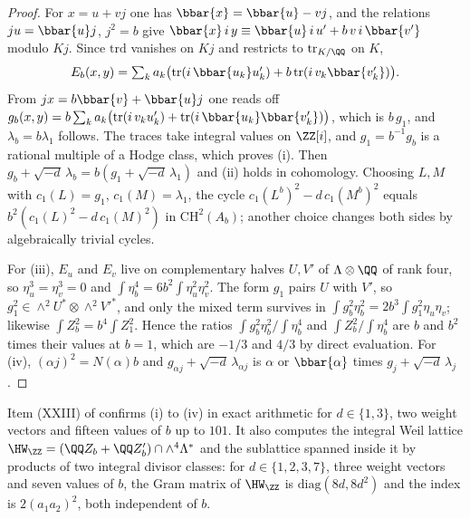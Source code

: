 \begin{proof}
For $x=u+vj$ one has $\bbar{x}=\bbar{u}-vj$, and the relations $ju=\bbar{u}j$,
$j^{2}=b$ give
$\bbar{x}\,i\,y\equiv\bbar{u}\,i\,u'+b\,v\,i\,\bbar{v'}$ modulo $Kj$. Since
$\mathrm{trd}$ vanishes on $Kj$ and restricts to $\mathrm{tr}_{K/\QQ}$ on $K$,
\[
  E_{b}(x,y)=\textstyle\sum_{k}a_{k}\bigl(\mathrm{tr}(i\,\bbar{u_{k}}u'_{k})
  +b\,\mathrm{tr}(i\,v_{k}\bbar{v'_{k}})\bigr).
\]
From $jx=b\bbar{v}+\bbar{u}j$ one reads off
$g_{b}(x,y)=b\sum_{k}a_{k}\bigl(\mathrm{tr}(i\,v_{k}u'_{k})
+\mathrm{tr}(i\,\bbar{u_{k}}\bbar{v'_{k}})\bigr)$, which is $b\,g_{1}$, and
$\lambda_{b}=b\lambda_{1}$ follows. The traces take integral values on
$\ZZ[i]$, and $g_{1}=b^{-1}g_{b}$ is a rational multiple of a Hodge class,
which proves (i). Then $g_{b}+\sqrt{-d}\,\lambda_{b}=b(g_{1}+\sqrt{-d}\,\lambda_{1})$
and (ii) holds in cohomology. Choosing $L,M$ with $c_{1}(L)=g_{1}$,
$c_{1}(M)=\lambda_{1}$, the cycle $c_{1}(L^{b})^{2}-d\,c_{1}(M^{b})^{2}$ equals
$b^{2}(c_{1}(L)^{2}-d\,c_{1}(M)^{2})$ in $\mathrm{CH}^{2}(A_{b})$; another
choice changes both sides by algebraically trivial cycles.

For (iii), $E_{u}$ and $E_{v}$ live on complementary halves $U,V'$ of
$\Lambda\otimes\QQ$ of rank four, so $\eta_{u}^{3}=\eta_{v}^{3}=0$ and
$\int\eta_{b}^{4}=6b^{2}\int\eta_{u}^{2}\eta_{v}^{2}$. The form $g_{1}$ pairs
$U$ with $V'$, so $g_{1}^{2}\in\wedge^{2}U^{*}\otimes\wedge^{2}V'^{*}$, and
only the mixed term survives in
$\int g_{b}^{2}\eta_{b}^{2}=2b^{3}\int g_{1}^{2}\eta_{u}\eta_{v}$; likewise
$\int Z_{b}^{2}=b^{4}\int Z_{1}^{2}$. Hence the ratios
$\int g_{b}^{2}\eta_{b}^{2}/\int\eta_{b}^{4}$ and
$\int Z_{b}^{2}/\int\eta_{b}^{4}$ are $b$ and $b^{2}$ times their values at
$b=1$, which are $-1/3$ and $4/3$ by direct evaluation. For (iv), $(\alpha j)^{2}=N(\alpha)b$ and
$g_{\alpha j}+\sqrt{-d}\,\lambda_{\alpha j}$ is $\alpha$ or $\bbar{\alpha}$
times $g_{j}+\sqrt{-d}\,\lambda_{j}$.
\end{proof}

Item (XXIII) of  confirms (i) to (iv) in exact
arithmetic for $d\in\{1,3\}$, two weight vectors and fifteen values of $b$ up
to $101$. It also computes the integral Weil lattice
$\HW_{\ZZ}=(\QQ Z_{b}+\QQ Z'_{b})\cap\wedge^{4}\Lambda^{*}$ and the
sublattice spanned inside it by products of two integral divisor classes: for
$d\in\{1,2,3,7\}$, three weight vectors and seven values of $b$, the Gram
matrix of $\HW_{\ZZ}$ is $\mathrm{diag}(8d,8d^{2})$ and the index is
$2(a_{1}a_{2})^{2}$, both independent of $b$.

